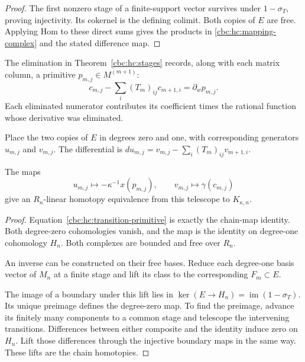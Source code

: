 \begin{proof}
The first nonzero stage of a finite-support vector survives
under $1-\sigma_T$, proving injectivity. Its cokernel is
the defining colimit. Both copies of $E$ are free.
Applying Hom to these direct sums gives the products in
\eqref{cbc:hc:mapping-complex} and the stated difference map.
\end{proof}

The elimination in Theorem~\ref{cbc:hc:stages} records, along
with each matrix column, a primitive $p_{m,j}\in M^{(m+1)}$:
\begin{equation}\label{cbc:hc:transition-primitive}
 c_{m,j}-\sum_i(T_m)_{ij}c_{m+1,i}=\partial_wp_{m,j}.
\end{equation}
Each eliminated numerator contributes its coefficient times
the rational function whose derivative was eliminated.

Place the two copies of $E$ in degrees zero and one,
with corresponding generators $u_{m,j}$ and $v_{m,j}$.
The differential is
$du_{m,j}=v_{m,j}-\sum_i(T_m)_{ij}v_{m+1,i}$.

\begin{proposition}\label{cbc:hc:chain-comparison}
The maps
\begin{equation}\label{cbc:hc:comparison-formula}
 u_{m,j}\longmapsto-\kappa^{-1}x(p_{m,j}),\qquad
 v_{m,j}\longmapsto\gamma(c_{m,j})
\end{equation}
give an $R_n$-linear homotopy equivalence from this
telescope to $K_{\kappa,n}$.
\end{proposition}

\begin{proof}
Equation~\eqref{cbc:hc:transition-primitive} is exactly the
chain-map identity. Both degree-zero cohomologies vanish,
and the map is the identity on degree-one cohomology $H_n$.
Both complexes are bounded and free over $R_n$.

An inverse can be constructed on their free bases. Reduce
each degree-one basis vector of $M_n$ at a finite stage
and lift its class to the corresponding $F_m\subset E$.

The image of a boundary under this lift lies in
$\ker(E\to H_n)=\operatorname{im}(1-\sigma_T)$. Its unique
preimage defines the degree-zero map. To find the preimage,
advance its finitely many components to a common stage and
telescope the intervening transitions.
Differences between
either composite and the identity induce zero on $H_n$.
Lift those differences through the injective boundary maps
in the same way. These lifts are the chain homotopies.
\end{proof}


